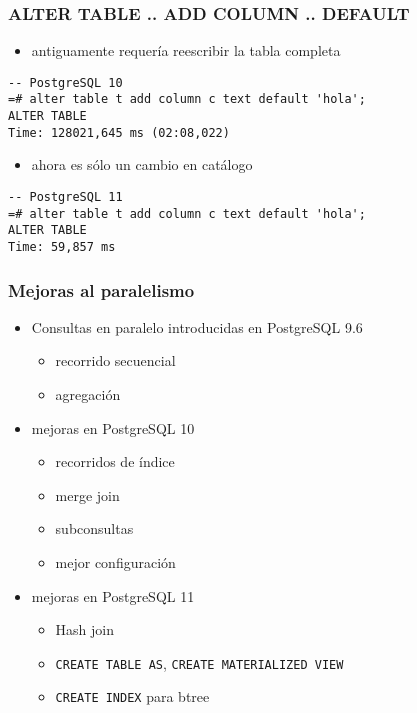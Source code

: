 \begin{frame}[fragile]
  \frametitle{ALTER TABLE .. ADD COLUMN .. DEFAULT}

  \begin{itemize}
    \item antiguamente requería reescribir la tabla completa
  \end{itemize}

\begin{lstlisting}
-- PostgreSQL 10
=# alter table t add column c text default 'hola';
ALTER TABLE
Time: 128021,645 ms (02:08,022)
\end{lstlisting}

  \begin{itemize}
    \item ahora es sólo un cambio en catálogo
  \end{itemize}

\begin{lstlisting}
-- PostgreSQL 11
=# alter table t add column c text default 'hola';
ALTER TABLE
Time: 59,857 ms
\end{lstlisting}
\end{frame}


\begin{frame}
  \frametitle{Mejoras al paralelismo}

\begin{itemize}
  \item Consultas en paralelo introducidas en PostgreSQL 9.6
    \begin{itemize}
      \item recorrido secuencial
      \item agregación
    \end{itemize}
  \item mejoras en PostgreSQL 10
   \begin{itemize}
     \item recorridos de índice
     \item merge join
     \item subconsultas
     \item mejor configuración
   \end{itemize}
 \item mejoras en PostgreSQL 11
   \begin{itemize}
     \item Hash join
     \item \texttt{CREATE TABLE AS}, \texttt{CREATE MATERIALIZED VIEW}
     \item \texttt{CREATE INDEX} para btree
   \end{itemize}
\end{itemize}
\end{frame}

